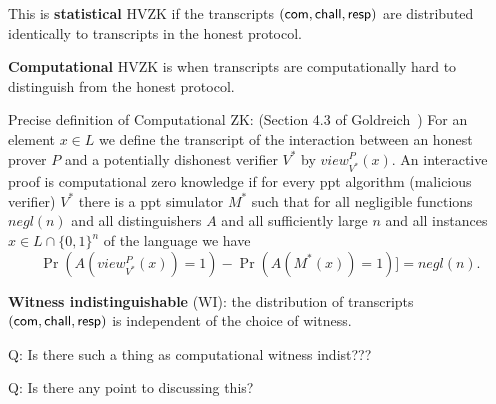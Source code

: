 This is \textbf{statistical} HVZK if the transcripts $(\mathsf{com}, \mathsf{chall}, \mathsf{resp} )$ are distributed identically to transcripts in the honest protocol.

\textbf{Computational} HVZK is when transcripts are computationally hard to distinguish from the honest protocol.


Precise definition of Computational ZK:
(Section 4.3 of Goldreich~\cite{Gol01})
For an element $x \in L$ we define the transcript of the interaction between an honest prover $P$ and a potentially dishonest verifier $V^*$ by $view^P_{V^*}(x)$.
An interactive proof is computational zero knowledge if for every ppt algorithm (malicious verifier) $V^*$ there is a ppt simulator $M^*$ such that 
for all negligible functions $negl(n)$ and all distinguishers $A$ and all sufficiently large $n$ and all instances $x \in L \cap \{ 0,1 \}^n$ of the language
we have
\[
   \Pr( A( view^P_{V^*}(x) )=1 ) - \Pr( A( M^*(x) )=1 )]  = negl(n).
\]



\textbf{Witness indistinguishable} (WI): the distribution of transcripts $(\mathsf{com}, \mathsf{chall}, \mathsf{resp} )$ is independent of the choice of witness.

Q: Is there such a thing as computational witness indist???

Q: Is there any point to discussing this?

\fi

